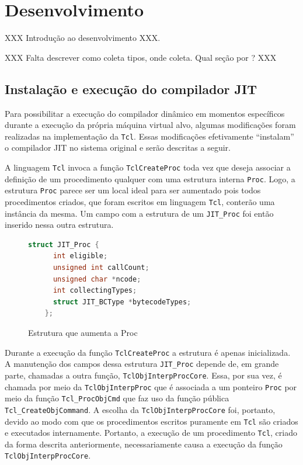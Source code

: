 \section{Desenvolvimento}
\label{desenvolvimento}

XXX Introdução ao desenvolvimento XXX.

XXX Falta descrever como coleta tipos, onde coleta. Qual seção por ? XXX

\subsection{Instalação e execução do compilador JIT}
\label{install-exec}
Para possibilitar a execução do compilador dinâmico em momentos
específicos durante a execução da própria máquina virtual alvo, algumas
modificações foram realizadas na implementação da
\texttt{Tcl}. Essas modificações efetivamente ``instalam'' o
compilador JIT no sistema original e serão descritas a seguir.

A linguagem \texttt{Tcl} invoca a função \verb!TclCreateProc! toda vez
que deseja associar a definição de um procedimento qualquer com uma
estrutura interna \verb!Proc!. Logo, a estrutura \verb!Proc! parece
ser um local ideal para ser aumentado pois todos procedimentos
criados, que foram escritos em linguagem \texttt{Tcl}, conterão uma
instância da mesma. Um campo com a estrutura de um
\verb!JIT_Proc! foi então inserido nessa outra estrutura.

\begin{figure}[h]
  \centering
  \begin{lstlisting}[language=C]
    struct JIT_Proc {
      int eligible;
      unsigned int callCount;
      unsigned char *ncode;
      int collectingTypes;
      struct JIT_BCType *bytecodeTypes;
    };
  \end{lstlisting}
  \caption{\label{jitproc}Estrutura que aumenta a Proc}
\end{figure}

Durante a execução da função \verb!TclCreateProc! a estrutura é apenas
inicializada. A manutenção dos campos dessa estrutura \verb!JIT_Proc!
depende de, em grande parte, chamadas a outra função,
\verb!TclObjInterpProcCore!. Essa,
por sua vez, é chamada por meio da \verb!TclObjInterpProc! que é associada
a um ponteiro \verb!Proc! por meio da função \verb!Tcl_ProcObjCmd! que
faz uso da função pública \verb!Tcl_CreateObjCommand!. A escolha da
\verb!TclObjInterpProcCore! foi, portanto, devido ao modo com que os
procedimentos escritos puramente em \texttt{Tcl} são criados
e executados internamente.
Portanto, a execução de um procedimento \texttt{Tcl},
criado da forma descrita anteriormente, necessariamente causa a
execução da função \verb!TclObjInterpProcCore!.

